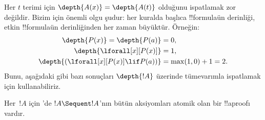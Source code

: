 Her $t$ terimi için $\depth{A(x)} = \depth{A(t)}$ olduğunu ispatlamak zor
değildir. Bizim için önemli olgu şudur: her kuralda başlıca !!{formula}{}ün
derinliği, etkin !!{formula}{}ün derinliğinden her zaman büyüktür. Örneğin:
\begin{align*}
\depth{P(x)} = \depth{P(a)} & = 0,\\
\depth{\lforall[x][P(x)]} & = 1,\\
\depth{(\lforall[x][P(x)] \lif P(a))} & = \max(1,0) + 1 = 2.
\end{align*}
Bunu, aşağıdaki gibi bazı sonuçları $\depth{!A}$ üzerinde tümevarımla
ispatlamak için kullanabiliriz.

\begin{prop}
Her~$!A$ için 'de $!A \Sequent !A$'nın bütün aksiyomları atomik
olan bir !!a{proof}{}ı vardır.
\end{prop}

